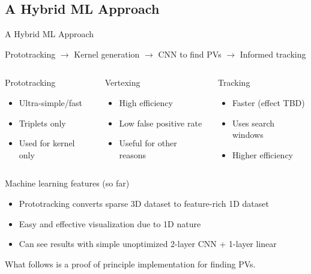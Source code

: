 \subsection{A Hybrid ML Approach}
\begin{frame}{A Hybrid ML Approach}
\begin{center}
Prototracking $\rightarrow$ Kernel generation $\rightarrow$ CNN to find PVs $\rightarrow$ Informed tracking
\end{center}

\begin{columns}[b]
    \begin{block}{Prototracking}
    \begin{itemize}
        \item Ultra-simple/fast
        \item Triplets only
        \item Used for kernel only
        \end{itemize}
    \end{block}
    \begin{block}{Vertexing}
    \begin{itemize}
        \item High efficiency
        \item Low false positive rate
        \item Useful for other reasons
        \end{itemize}
    \end{block}
    \begin{block}{Tracking}
    \begin{itemize}
        \item Faster (effect TBD)
        \item Uses search windows
        \item Higher efficiency
    \end{itemize}
    \end{block}
\end{columns}
    \begin{block}{Machine learning features (so far)}
        \begin{itemize}
            \item Prototracking converts sparse 3D dataset to feature-rich 1D dataset
            \item Easy and effective visualization due to 1D nature
            \item Can see results with simple unoptimized 2-layer CNN + 1-layer linear
        \end{itemize}
    \end{block}

\vspace{.3em}
\begin{center}
What follows is a proof of principle implementation for finding PVs.
\end{center}
\end{frame}


